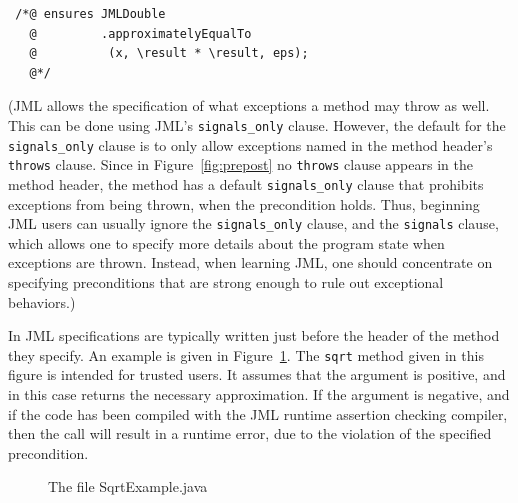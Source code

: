 \documentclass[twocolumn]{article}
\begin{document}
\begin{verbatim}
 /*@ ensures JMLDouble
   @         .approximatelyEqualTo
   @          (x, \result * \result, eps);
   @*/
\end{verbatim}

(JML allows the specification of what exceptions a method may throw as
well.  This can be done using JML's \verb|signals_only| clause.
However, the default for the \verb|signals_only| clause is to only
allow exceptions named in the method header's \texttt{throws} clause.
Since in Figure~\ref{fig:prepost} no \texttt{throws} clause appears in
the method header, the method has a default \verb|signals_only| clause
that prohibits exceptions from being thrown, when the precondition
holds.  Thus, beginning JML users can usually ignore the
\verb|signals_only| clause, and the \texttt{signals} clause, which
allows one to specify more details about the program state when
exceptions are thrown.
Instead, when learning JML, one should concentrate on specifying
preconditions that are strong enough to rule out exceptional
behaviors.)

In JML specifications are typically written just before the header
of the method they specify.  An example is given in
Figure~\ref{fig-SqrtExample}.  The \texttt{sqrt} method given in this
figure is intended for trusted users. It assumes that the
argument is positive, and in this case returns the necessary
approximation.  If the argument is negative, and if the code has been
compiled with the JML runtime assertion checking compiler, then the
call will result in a runtime error, due to the violation of the specified
precondition. 

\begin{figure}

\caption{The file SqrtExample.java}
\label{fig-SqrtExample}
\end{figure}

\end{document}
